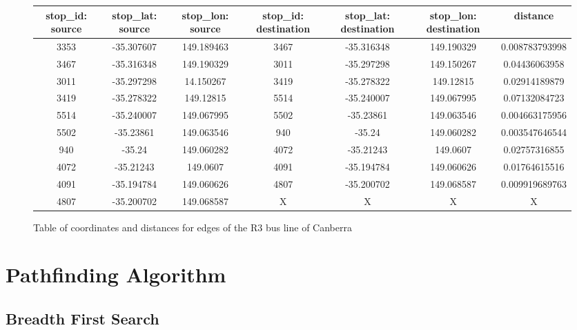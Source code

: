 \documentclass{article}
\begin{document}
\begin{center}
\begin{figure}[h]
\begin{adjustbox}{max width=\textwidth}
\begin{tabular}{ |c|c|c|c|c|c|c| } 
 \hline
 stop\_id: source & stop\_lat: source & stop\_lon: source & stop\_id: destination & stop\_lat: destination & stop\_lon: destination & distance \\ 
 \hline
 3353 & -35.307607 & 149.189463 & 3467 & -35.316348 & 149.190329 & 0.008783793998 \\ 
 \hline
 3467 & -35.316348 & 149.190329 & 3011 & -35.297298 & 149.150267 & 0.04436063958 \\
 \hline
 3011 & -35.297298 & 14.150267 & 3419 & -35.278322 & 149.12815 & 0.02914189879 \\
 \hline
 3419 & -35.278322 & 149.12815 & 5514 & -35.240007 & 149.067995 & 0.07132084723 \\
 \hline
 5514 & -35.240007 & 149.067995 & 5502 & -35.23861 & 149.063546 & 0.004663175956 \\
 \hline
 5502 & -35.23861 & 149.063546 & 940 & -35.24 & 149.060282 & 0.003547646544 \\
 \hline
 940 & -35.24 & 149.060282 & 4072 & -35.21243 & 149.0607 & 0.02757316855 \\
 \hline
 4072 & -35.21243 & 149.0607 & 4091 & -35.194784 & 149.060626 & 0.01764615516 \\
 \hline
 4091 & -35.194784 & 149.060626 & 4807 & -35.200702 & 149.068587 & 0.009919689763 \\
 \hline
 4807 & -35.200702 & 149.068587 & X & X & X & X \\ 
 \hline
\end{tabular}
\end{adjustbox}
\caption{Table of coordinates and distances for edges of the R3 bus line of Canberra}
\end{figure}
\end{center}

\newpage

\section{Pathfinding Algorithm}

\subsection{Breadth First Search}
\end{document}
